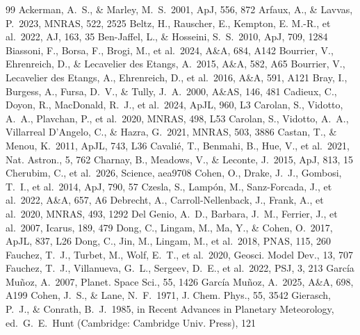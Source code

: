 \documentclass[english,a4paper]{my_memo}
\begin{document}
\begin{thebibliography}{99}\small
\setlength{\itemsep}{0.3ex}
\setlength{\parskip}{0pt}
 Ackerman, A.~S., \& Marley, M.~S.\ 2001, ApJ, 556, 872
 Arfaux, A., \& Lavvas, P.\ 2023, MNRAS, 522, 2525
 Beltz, H., Rauscher, E., Kempton, E. M.-R., et al.\ 2022, AJ, 163, 35
 Ben-Jaffel, L., \& Hosseini, S.~S.\ 2010, ApJ, 709, 1284
 Biassoni, F., Borsa, F., Brogi, M., et al.\ 2024, A\&A, 684, A142
 Bourrier, V., Ehrenreich, D., \& Lecavelier des Etangs, A.\ 2015, A\&A, 582, A65
 Bourrier, V., Lecavelier des Etangs, A., Ehrenreich, D., et al.\ 2016, A\&A, 591, A121
 Bray, I., Burgess, A., Fursa, D.~V., \& Tully, J.~A.\ 2000, A\&AS, 146, 481
 Cadieux, C., Doyon, R., MacDonald, R.~J., et al.\ 2024, ApJL, 960, L3
 Carolan, S., Vidotto, A.~A., Plavchan, P., et al.\ 2020, MNRAS, 498, L53
 Carolan, S., Vidotto, A.~A., Villarreal D'Angelo, C., \& Hazra, G.\ 2021, MNRAS, 503, 3886
 Castan, T., \& Menou, K.\ 2011, ApJL, 743, L36
 Cavali\'e, T., Benmahi, B., Hue, V., et al.\ 2021, Nat. Astron., 5, 762
 Charnay, B., Meadows, V., \& Leconte, J.\ 2015, ApJ, 813, 15
 Cherubim, C., et al.\ 2026, Science, aea9708
 Cohen, O., Drake, J.~J., Gombosi, T.~I., et al.\ 2014, ApJ, 790, 57
 Czesla, S., Lamp\'on, M., Sanz-Forcada, J., et al.\ 2022, A\&A, 657, A6
 Debrecht, A., Carroll-Nellenback, J., Frank, A., et al.\ 2020, MNRAS, 493, 1292
 Del Genio, A.~D., Barbara, J.~M., Ferrier, J., et al.\ 2007, Icarus, 189, 479
 Dong, C., Lingam, M., Ma, Y., \& Cohen, O.\ 2017, ApJL, 837, L26
 Dong, C., Jin, M., Lingam, M., et al.\ 2018, PNAS, 115, 260
 Fauchez, T.~J., Turbet, M., Wolf, E.~T., et al.\ 2020, Geosci. Model Dev., 13, 707
 Fauchez, T.~J., Villanueva, G.~L., Sergeev, D.~E., et al.\ 2022, PSJ, 3, 213
 Garc\'ia Mu\~noz, A.\ 2007, Planet. Space Sci., 55, 1426
 Garc\'ia Mu\~noz, A.\ 2025, A\&A, 698, A199
 Cohen, J.~S., \& Lane, N.~F.\ 1971, J. Chem. Phys., 55, 3542
 Gierasch, P.~J., \& Conrath, B.~J.\ 1985, in Recent Advances in Planetary Meteorology, ed.\ G.~E.\ Hunt (Cambridge: Cambridge Univ. Press), 121

\end{thebibliography}
\end{document}
